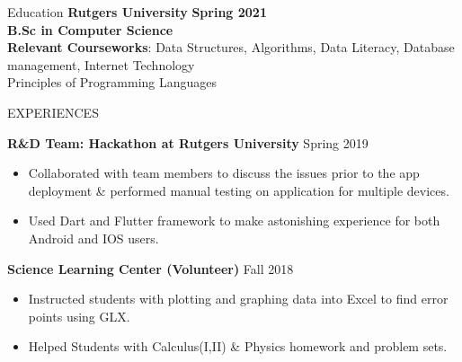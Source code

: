 \documentclass{resume}
\begin{document}

\begin{rSection}{Education}
{\bf Rutgers University}  \hfill {\bf Spring 2021}\\
{\bf B.Sc in Computer Science}\\
{ \bf Relevant Courseworks}: Data Structures, Algorithms, Data Literacy, Database management, Internet Technology\\
Principles of Programming Languages 
\end{rSection}

\begin{rSection}{EXPERIENCES}


\textbf{R\&D Team: Hackathon at Rutgers University} \hfill Spring 2019
 \begin{itemize}
    \itemsep -2pt {} 
     \item Collaborated with team members to discuss the issues prior to the app deployment  \& performed manual testing on application for multiple devices.
     \item Used Dart and  Flutter framework to make astonishing experience for both Android and IOS users.
 \end{itemize}
 
\textbf{Science Learning Center (Volunteer)} \hfill Fall 2018
 \begin{itemize}
    \itemsep -2pt {} 
     \item Instructed students with plotting and graphing data into Excel to find error points using GLX.
     \item Helped Students with Calculus(I,II) \& Physics homework and problem sets.
 \end{itemize}
\end{rSection} 

\end{document}
